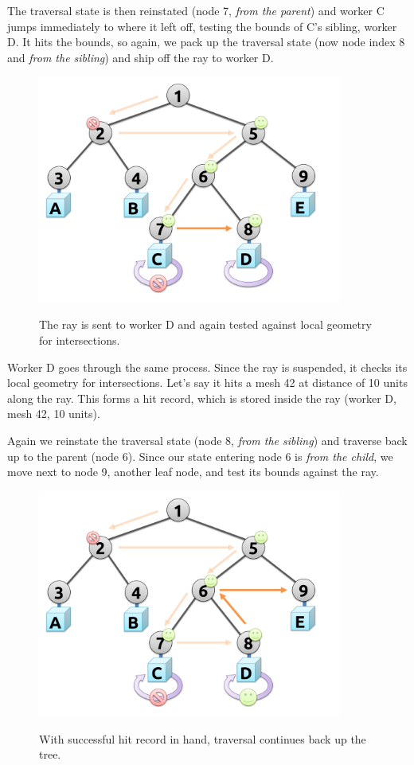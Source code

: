 \documentclass[12pt]{ucthesis}
\newcommand{\captionfonts}{\small\bf\ssp}
\begin{document}
The traversal state is then reinstated (node 7, \emph{from the parent}) and
worker C jumps immediately to where it left off, testing the bounds of C's
sibling, worker D. It hits the bounds, so again, we pack up the traversal
state (now node index 8 and \emph{from the sibling}) and ship off the ray to
worker D.

\begin{figure}[H]
    \centering
    \includegraphics[width=100mm]{figures/traversal5.pdf}
    \captionfonts
    \caption{The ray is sent to worker D and again tested against local geometry for intersections.}
    \label{fig:traversal5}
\end{figure}

Worker D goes through the same process. Since the ray is suspended, it checks
its local geometry for intersections. Let's say it hits a mesh 42 at distance
of 10 units along the ray. This forms a hit record, which is stored inside the
ray (worker D, mesh 42, 10 units).

Again we reinstate the traversal state (node 8, \emph{from the sibling}) and
traverse back up to the parent (node 6). Since our state entering node 6 is
\emph{from the child}, we move next to node 9, another leaf node, and test
its bounds against the ray.

\begin{figure}[H]
    \centering
    \includegraphics[width=100mm]{figures/traversal6.pdf}
    \captionfonts
    \caption{With successful hit record in hand, traversal continues back up the tree.}
    \label{fig:traversal6}
\end{figure}
\end{document}
